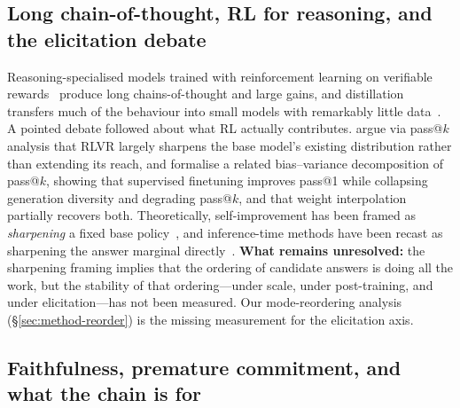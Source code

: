 \subsection{Long chain-of-thought, RL for reasoning, and the elicitation debate}

Reasoning-specialised models trained with reinforcement learning on verifiable
rewards~\citep{deepseekr1_2025,shao2024deepseekmath} produce long
chains-of-thought and large gains, and distillation transfers much of the
behaviour into small models with remarkably little
data~\citep{muennighoff2025s1,ye2025limo}. A pointed debate followed about what
RL actually contributes. \citet{yue2025rlvr} argue via pass@$k$ analysis that
RLVR largely sharpens the base model's existing distribution rather than
extending its reach, and \citet{diversitycollapse2025} formalise a related
bias--variance decomposition of pass@$k$, showing that supervised finetuning
improves pass@1 while collapsing generation diversity and degrading pass@$k$,
and that weight interpolation partially recovers both. Theoretically,
self-improvement has been framed as \emph{sharpening} a fixed base
policy~\citep{huang2025sharpening}, and inference-time methods have been
recast as sharpening the answer marginal
directly~\citep{marginalsharpening2026}. \textbf{What remains unresolved:} the
sharpening framing implies that the ordering of candidate answers is doing all
the work, but the stability of that ordering---under scale, under
post-training, and under elicitation---has not been measured. Our
mode-reordering analysis (\S\ref{sec:method-reorder}) is the missing
measurement for the elicitation axis.

\subsection{Faithfulness, premature commitment, and what the chain is for}

